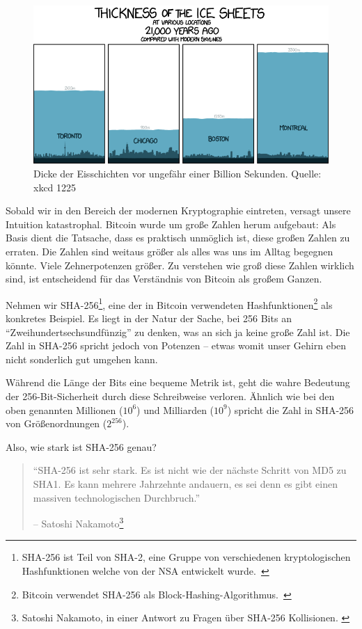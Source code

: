 \begin{figure}
  \includegraphics{assets/images/xkcd-1225.png}
  \caption{Dicke der Eisschichten vor ungefähr einer Billion Sekunden. Quelle: xkcd 1225}
  \label{fig:xkcd-1225}
\end{figure}

Sobald wir in den Bereich der modernen Kryptographie eintreten, versagt unsere
Intuition katastrophal. Bitcoin wurde um große Zahlen herum aufgebaut: Als Basis dient
die Tatsache, dass es praktisch unmöglich ist, diese großen Zahlen zu erraten. Die Zahlen sind
weitaus größer als alles was uns im Alltag begegnen könnte. Viele Zehnerpotenzen
größer. Zu verstehen wie groß diese Zahlen wirklich sind, ist entscheidend für
das Verständnis von Bitcoin als großem Ganzen.

Nehmen wir SHA-256\footnote{SHA-256 ist Teil von SHA-2, eine Gruppe von
verschiedenen kryptologischen Hashfunktionen welche von der NSA entwickelt
wurde.~\cite{wiki:sha2}}, eine der in Bitcoin verwendeten
Hashfunktionen\footnote{Bitcoin verwendet SHA-256 als
Block-Hashing-Algorithmus.~\cite{btcwiki:block-hashing}} als konkretes Beispiel.
Es liegt in der Natur der Sache, bei 256 Bits an
\enquote{Zweihundertsechsundfünzig} zu denken, was an sich ja keine große Zahl
ist. Die Zahl in SHA-256 spricht jedoch von Potenzen -- etwas womit unser Gehirn
eben nicht sonderlich gut umgehen kann.

Während die Länge der Bits eine bequeme Metrik ist, geht die wahre Bedeutung der
256-Bit-Sicherheit durch diese Schreibweise verloren. Ähnlich wie bei den oben
genannten Millionen ($10^6$) und Milliarden ($10^9$) spricht die Zahl in SHA-256
von Größenordnungen ($2^{256}$).

Also, wie stark ist SHA-256 genau?

\begin{quotation}\begin{samepage}
\enquote{SHA-256 ist sehr stark. Es ist nicht wie der nächste Schritt von MD5 zu
SHA1. Es kann mehrere Jahrzehnte andauern, es sei denn es gibt einen massiven
technologischen Durchbruch.}
\begin{flushright} -- Satoshi Nakamoto\footnote{Satoshi Nakamoto, in einer
Antwort zu Fragen über SHA-256 Kollisionen. \cite{satoshi-sha256}}
\end{flushright}\end{samepage}\end{quotation}

